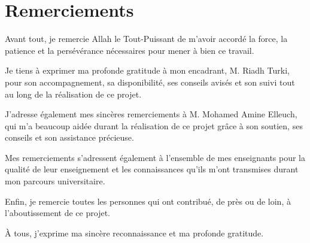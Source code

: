 \newpage
\thispagestyle{empty}
\section*{Remerciements}

Avant tout, je remercie Allah le Tout-Puissant de m'avoir accordé la force, la patience et la persévérance nécessaires pour mener à bien ce travail.

Je tiens à exprimer ma profonde gratitude à mon encadrant, M. Riadh Turki, pour son accompagnement, sa disponibilité, ses conseils avisés et son suivi tout au long de la réalisation de ce projet.

J'adresse également mes sincères remerciements à M. Mohamed Amine Elleuch, qui m'a beaucoup aidée durant la réalisation de ce projet grâce à son soutien, ses conseils et son assistance précieuse.

Mes remerciements s'adressent également à l'ensemble de mes enseignants pour la qualité de leur enseignement et les connaissances qu'ils m'ont transmises durant mon parcours universitaire.

Enfin, je remercie toutes les personnes qui ont contribué, de près ou de loin, à l'aboutissement de ce projet.

À tous, j'exprime ma sincère reconnaissance et ma profonde gratitude.